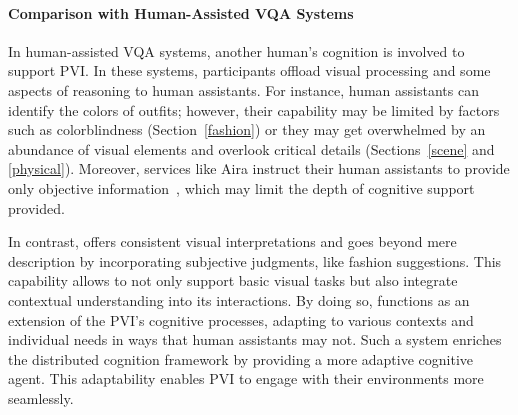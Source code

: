 \paragraph{Comparison with Human-Assisted VQA Systems}
In human-assisted VQA systems, another human’s cognition is involved to support PVI. In these systems, participants offload visual processing and some aspects of reasoning to human assistants. 
For instance, human assistants can identify the colors of outfits; however, their capability may be limited by factors such as colorblindness (Section~\ref{fashion}) or they may get overwhelmed by an abundance of visual elements and overlook critical details (Sections~\ref{scene} and \ref{physical}). Moreover, services like Aira instruct their human assistants to provide only objective information~\cite{lee2020emerging,xie2023two}, which may limit the depth of cognitive support provided. 

In contrast, \bma{} offers consistent visual interpretations and goes beyond mere description by incorporating subjective judgments, like fashion suggestions. 
This capability allows \bma{} to not only support basic visual tasks but also integrate contextual understanding into its interactions. 
%
By doing so, \bma{} functions as an extension of the PVI's cognitive processes, adapting to various contexts and individual needs in ways that human assistants may not. Such a system enriches the distributed cognition framework by providing a more adaptive cognitive agent. This adaptability enables PVI to engage with their environments more seamlessly. 











